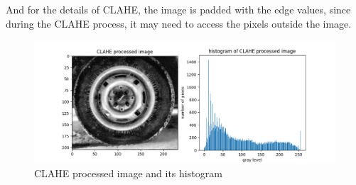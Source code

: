 And for the details of CLAHE, the image is padded with the edge values, since during the CLAHE process, it may need to access the pixels outside the image.

\begin{figure}[htbp]
    \centering
	\includegraphics[width=\textwidth]{../images/p1/p1c.png}
    \caption{CLAHE processed image and its histogram}
    \label{fig:p1c}
\end{figure}

\newpage